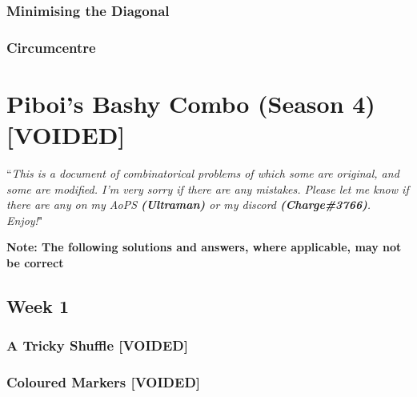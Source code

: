 \documentclass[titlepage=true]{scrartcl}
\begin{document}
        \subsubsection{Minimising the Diagonal}
             \label{3-1-6}
            
        \newpage
        
        \subsubsection{Circumcentre}
            \label{3-1-7}
            
        \newpage
        
\section{Piboi's Bashy Combo (Season 4) \textbf[VOIDED]}
        
    
    \newpage 
        
    ``\emph{This is a document of combinatorical problems of which some are original, and some are modified. I'm very sorry if there are any mistakes. Please let me know if there are any on my AoPS \textbf{(Ultraman)} or my discord \textbf{(Charge\#3766)}. Enjoy!}"\\
        
    \begin{center}
        \textbf{Note: The following solutions and answers, where applicable, may not be correct}
    \end{center}
  
    \subsection{Week 1}
                
        \subsubsection{A Tricky Shuffle \textbf[VOIDED]}
            \label{4-1-1}
            
        \newpage 
                
        \subsubsection{Coloured Markers \textbf[VOIDED]}
            \label{4-1-2}
            
        \newpage 
        
\end{document}

